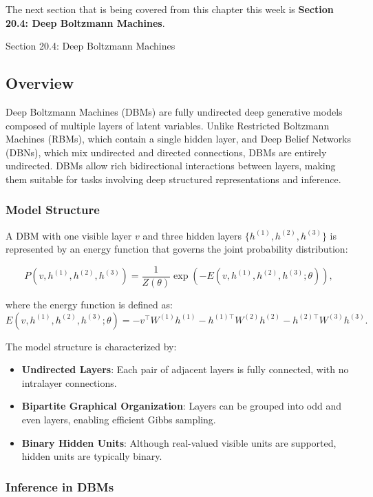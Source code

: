 The next section that is being covered from this chapter this week is \textbf{Section 20.4: Deep Boltzmann Machines}.

\begin{notes}{Section 20.4: Deep Boltzmann Machines}
    \subsection*{Overview}

    Deep Boltzmann Machines (DBMs) are fully undirected deep generative models composed of multiple layers of latent variables. Unlike Restricted Boltzmann Machines (RBMs), which contain a single hidden layer, and Deep Belief Networks (DBNs), which mix undirected and directed connections, DBMs are entirely undirected. DBMs allow rich bidirectional interactions between layers, making them suitable for tasks involving deep structured representations and inference.
    
    \subsubsection*{Model Structure}
    
    A DBM with one visible layer $v$ and three hidden layers $\{h^{(1)}, h^{(2)}, h^{(3)}\}$ is represented by an energy function that governs the joint probability distribution:
    
    \[
    P(v, h^{(1)}, h^{(2)}, h^{(3)}) = \frac{1}{Z(\theta)} \exp\left(-E(v, h^{(1)}, h^{(2)}, h^{(3)}; \theta)\right),
    \]
    
    where the energy function is defined as:
    \[
    E(v, h^{(1)}, h^{(2)}, h^{(3)}; \theta) = -v^\top W^{(1)} h^{(1)} - h^{(1)\top} W^{(2)} h^{(2)} - h^{(2)\top} W^{(3)} h^{(3)}.
    \]
    
    The model structure is characterized by:
    \begin{itemize}
        \item \textbf{Undirected Layers}: Each pair of adjacent layers is fully connected, with no intralayer connections.
        \item \textbf{Bipartite Graphical Organization}: Layers can be grouped into odd and even layers, enabling efficient Gibbs sampling.
        \item \textbf{Binary Hidden Units}: Although real-valued visible units are supported, hidden units are typically binary.
    \end{itemize}
    
    \subsubsection*{Inference in DBMs}
    

\end{notes}
